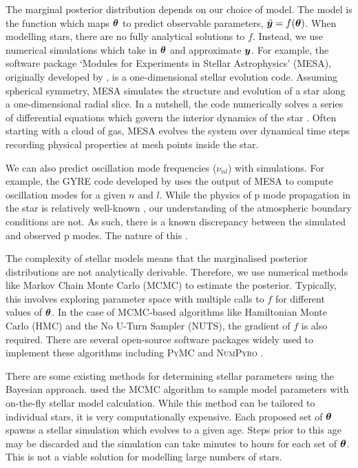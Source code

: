 The marginal posterior distribution depends on our choice of model. The model is the function which maps \(\bm{\theta}\) to predict observable parameters, \(\tilde{\bm{y}} = f(\bm{\theta})\). When modelling stars, there are no fully analytical solutions to \(f\). Instead, we use numerical simulations which take in \(\bm{\theta}\) and approximate \(\bm{y}\). For example, the software package `Modules for Experiments in Stellar Astrophysics' (MESA), originally developed by \citet{Paxton.Bildsten.ea2011}, is a one-dimensional stellar evolution code. Assuming spherical symmetry, MESA simulates the structure and evolution of a star along a one-dimensional radial slice. In a nutshell, the code numerically solves a series of differential equations which govern the interior dynamics of the star \citep[see e.g.][]{Kippenhahn.Weigert.ea2013}. Often starting with a cloud of gas, MESA evolves the system over dynamical time steps recording physical properties at mesh points inside the star.

We can also predict oscillation mode frequencies (\(\nu_{nl}\)) with simulations. For example, the GYRE code developed by \citet{Townsend.Teitler2013} uses the output of MESA to compute oscillation modes for a given \(n\) and \(l\). While the physics of p mode propagation in the star is relatively well-known \citep[see e.g.][]{Aerts.Christensen-Dalsgaard.ea2010}, our understanding of the atmospheric boundary conditions are not. As such, there is a known discrepancy between the simulated and observed p modes. The nature of this \citep{Ball.Gizon2014}.

The complexity of stellar models means that the marginalised posterior distributions are not analytically derivable. Therefore, we use numerical methods like Markov Chain Monte Carlo (MCMC) \needcite to estimate the posterior. Typically, this involves exploring parameter space with multiple calls to \(f\) for different values of \(\bm{\theta}\). In the case of MCMC-based algorithms like Hamiltonian Monte Carlo (HMC) and the No U-Turn Sampler (NUTS), the gradient of \(f\) is also required. There are several open-source software packages widely used to implement these algorithms including \textsc{PyMC} \citep{Salvatier.Wiecki.ea2016} and \textsc{NumPyro} \citep{Phan.Pradhan.ea2019}.

There are some existing methods for determining stellar parameters using the Bayesian approach. \citet{Bazot.Bourguignon.ea2008} used the MCMC algorithm to sample model parameters with on-the-fly stellar model calculation. While this method can be tailored to individual stars, it is very computationally expensive. Each proposed set of \(\bm{\theta}\) spawns a stellar simulation which evolves to a given age. Steps prior to this age may be discarded and the simulation can take minutes to hours for each set of \(\bm{\theta}\). This is not a viable solution for modelling large numbers of stars.

